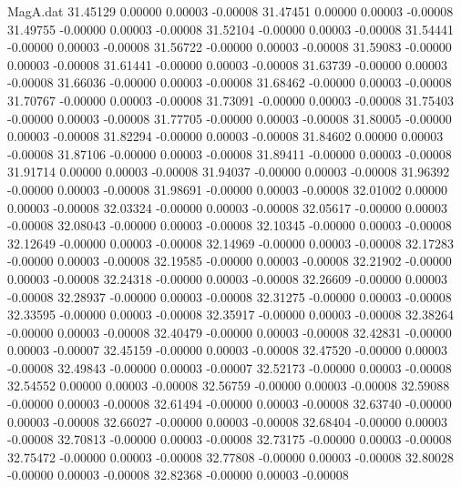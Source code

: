 \begin{filecontents}{MagA.dat}
  31.45129    0.00000    0.00003   -0.00008
  31.47451    0.00000    0.00003   -0.00008
  31.49755   -0.00000    0.00003   -0.00008
  31.52104   -0.00000    0.00003   -0.00008
  31.54441   -0.00000    0.00003   -0.00008
  31.56722   -0.00000    0.00003   -0.00008
  31.59083   -0.00000    0.00003   -0.00008
  31.61441   -0.00000    0.00003   -0.00008
  31.63739   -0.00000    0.00003   -0.00008
  31.66036   -0.00000    0.00003   -0.00008
  31.68462   -0.00000    0.00003   -0.00008
  31.70767   -0.00000    0.00003   -0.00008
  31.73091   -0.00000    0.00003   -0.00008
  31.75403   -0.00000    0.00003   -0.00008
  31.77705   -0.00000    0.00003   -0.00008
  31.80005   -0.00000    0.00003   -0.00008
  31.82294   -0.00000    0.00003   -0.00008
  31.84602    0.00000    0.00003   -0.00008
  31.87106   -0.00000    0.00003   -0.00008
  31.89411   -0.00000    0.00003   -0.00008
  31.91714    0.00000    0.00003   -0.00008
  31.94037   -0.00000    0.00003   -0.00008
  31.96392   -0.00000    0.00003   -0.00008
  31.98691   -0.00000    0.00003   -0.00008
  32.01002    0.00000    0.00003   -0.00008
  32.03324   -0.00000    0.00003   -0.00008
  32.05617   -0.00000    0.00003   -0.00008
  32.08043   -0.00000    0.00003   -0.00008
  32.10345   -0.00000    0.00003   -0.00008
  32.12649   -0.00000    0.00003   -0.00008
  32.14969   -0.00000    0.00003   -0.00008
  32.17283   -0.00000    0.00003   -0.00008
  32.19585   -0.00000    0.00003   -0.00008
  32.21902   -0.00000    0.00003   -0.00008
  32.24318   -0.00000    0.00003   -0.00008
  32.26609   -0.00000    0.00003   -0.00008
  32.28937   -0.00000    0.00003   -0.00008
  32.31275   -0.00000    0.00003   -0.00008
  32.33595   -0.00000    0.00003   -0.00008
  32.35917   -0.00000    0.00003   -0.00008
  32.38264   -0.00000    0.00003   -0.00008
  32.40479   -0.00000    0.00003   -0.00008
  32.42831   -0.00000    0.00003   -0.00007
  32.45159   -0.00000    0.00003   -0.00008
  32.47520   -0.00000    0.00003   -0.00008
  32.49843   -0.00000    0.00003   -0.00007
  32.52173   -0.00000    0.00003   -0.00008
  32.54552    0.00000    0.00003   -0.00008
  32.56759   -0.00000    0.00003   -0.00008
  32.59088   -0.00000    0.00003   -0.00008
  32.61494   -0.00000    0.00003   -0.00008
  32.63740   -0.00000    0.00003   -0.00008
  32.66027   -0.00000    0.00003   -0.00008
  32.68404   -0.00000    0.00003   -0.00008
  32.70813   -0.00000    0.00003   -0.00008
  32.73175   -0.00000    0.00003   -0.00008
  32.75472   -0.00000    0.00003   -0.00008
  32.77808   -0.00000    0.00003   -0.00008
  32.80028   -0.00000    0.00003   -0.00008
  32.82368   -0.00000    0.00003   -0.00008

\end{filecontents}
